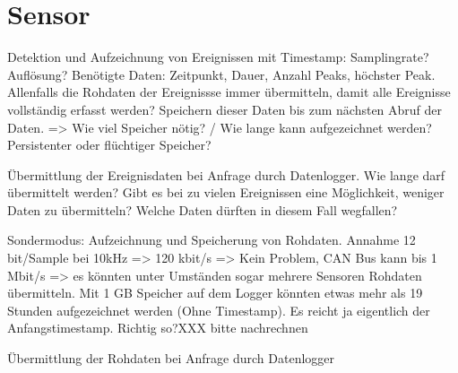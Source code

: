 \section{Sensor}
Detektion und Aufzeichnung von Ereignissen mit Timestamp: Samplingrate? Auflösung? Benötigte Daten: Zeitpunkt, Dauer, Anzahl Peaks, höchster Peak. Allenfalls die Rohdaten der Ereignissse immer übermitteln, damit alle Ereignisse vollständig erfasst werden? Speichern dieser Daten bis zum nächsten Abruf der Daten. => Wie viel Speicher nötig? / Wie lange kann aufgezeichnet werden? Persistenter oder flüchtiger Speicher?

Übermittlung der Ereignisdaten bei Anfrage durch Datenlogger. Wie lange darf übermittelt werden? Gibt es bei zu vielen Ereignissen eine Möglichkeit, weniger Daten zu übermitteln? Welche Daten dürften in diesem Fall wegfallen?

Sondermodus: Aufzeichnung und Speicherung von Rohdaten. Annahme 12 bit/Sample bei 10kHz => 120 kbit/s => Kein Problem, CAN Bus kann bis 1 Mbit/s => es könnten unter Umständen sogar mehrere Sensoren Rohdaten übermitteln. Mit 1 GB Speicher auf dem Logger könnten etwas mehr als 19 Stunden aufgezeichnet werden (Ohne Timestamp). Es reicht ja eigentlich der Anfangstimestamp. Richtig so?XXX bitte nachrechnen

Übermittlung der Rohdaten bei Anfrage durch Datenlogger
